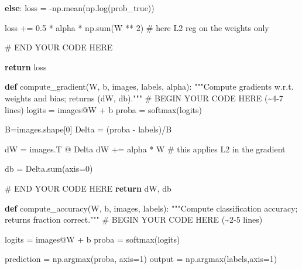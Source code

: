 \documentclass[
  letterpaper,
  DIV=11,
  numbers=noendperiod]{scrartcl}
\newenvironment{Shaded}{\begin{snugshade}}{\end{snugshade}}
\newcommand{\BuiltInTok}[1]{\textcolor[rgb]{0.00,0.23,0.31}{#1}}
\newcommand{\CommentTok}[1]{\textcolor[rgb]{0.37,0.37,0.37}{#1}}
\newcommand{\ControlFlowTok}[1]{\textcolor[rgb]{0.00,0.23,0.31}{\textbf{#1}}}
\newcommand{\DecValTok}[1]{\textcolor[rgb]{0.68,0.00,0.00}{#1}}
\newcommand{\FloatTok}[1]{\textcolor[rgb]{0.68,0.00,0.00}{#1}}
\newcommand{\KeywordTok}[1]{\textcolor[rgb]{0.00,0.23,0.31}{\textbf{#1}}}
\newcommand{\NormalTok}[1]{\textcolor[rgb]{0.00,0.23,0.31}{#1}}
\newcommand{\OperatorTok}[1]{\textcolor[rgb]{0.37,0.37,0.37}{#1}}
\newcommand{\RegionMarkerTok}[1]{\textcolor[rgb]{0.00,0.23,0.31}{#1}}
\begin{document}
\begin{Shaded}
\begin{Highlighting}[]
    \ControlFlowTok{else}\NormalTok{:}
\NormalTok{        loss }\OperatorTok{=} \OperatorTok{{-}}\NormalTok{np.mean(np.log(prob\_true))}

    
\NormalTok{    loss }\OperatorTok{+=} \FloatTok{0.5} \OperatorTok{*}\NormalTok{ alpha }\OperatorTok{*}\NormalTok{ np.}\BuiltInTok{sum}\NormalTok{(W }\OperatorTok{**} \DecValTok{2}\NormalTok{) }\CommentTok{\# here L2 reg on the weights only}


    \CommentTok{\# }\RegionMarkerTok{END}\CommentTok{ YOUR CODE HERE}



    \ControlFlowTok{return}\NormalTok{ loss}

\KeywordTok{def}\NormalTok{ compute\_gradient(W, b, images, labels, alpha):}
    \CommentTok{"""Compute gradients w.r.t. weights and bias; returns (dW, db)."""}
    \CommentTok{\# }\RegionMarkerTok{BEGIN}\CommentTok{ YOUR CODE HERE (\textasciitilde{}4{-}7 lines)}
\NormalTok{    logits }\OperatorTok{=}\NormalTok{  images}\OperatorTok{@}\NormalTok{W }\OperatorTok{+}\NormalTok{ b}
\NormalTok{    proba }\OperatorTok{=}\NormalTok{ softmax(logits)}

\NormalTok{    B}\OperatorTok{=}\NormalTok{images.shape[}\DecValTok{0}\NormalTok{]}
\NormalTok{    Delta }\OperatorTok{=}\NormalTok{ (proba }\OperatorTok{{-}}\NormalTok{ labels)}\OperatorTok{/}\NormalTok{B}

\NormalTok{    dW }\OperatorTok{=}\NormalTok{ images.T }\OperatorTok{@}\NormalTok{ Delta}
\NormalTok{    dW }\OperatorTok{+=}\NormalTok{ alpha }\OperatorTok{*}\NormalTok{ W }\CommentTok{\# this applies L2 in the gradient}
    
\NormalTok{    db }\OperatorTok{=}\NormalTok{ Delta.}\BuiltInTok{sum}\NormalTok{(axis}\OperatorTok{=}\DecValTok{0}\NormalTok{)}

    \CommentTok{\# }\RegionMarkerTok{END}\CommentTok{ YOUR CODE HERE}
    \ControlFlowTok{return}\NormalTok{ dW, db}

\KeywordTok{def}\NormalTok{ compute\_accuracy(W, b, images, labels):}
    \CommentTok{"""Compute classification accuracy; returns fraction correct."""}
    \CommentTok{\# }\RegionMarkerTok{BEGIN}\CommentTok{ YOUR CODE HERE (\textasciitilde{}2{-}5 lines)}

\NormalTok{    logits }\OperatorTok{=}\NormalTok{  images}\OperatorTok{@}\NormalTok{W }\OperatorTok{+}\NormalTok{ b}
\NormalTok{    proba }\OperatorTok{=}\NormalTok{ softmax(logits)}

\NormalTok{    prediction }\OperatorTok{=}\NormalTok{ np.argmax(proba, axis}\OperatorTok{=}\DecValTok{1}\NormalTok{)}
\NormalTok{    output }\OperatorTok{=}\NormalTok{ np.argmax(labels,axis}\OperatorTok{=}\DecValTok{1}\NormalTok{)}


\end{Highlighting}
\end{Shaded}
\end{document}
